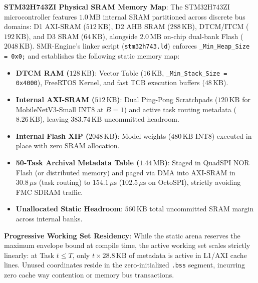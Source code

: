 \documentclass{article}
\begin{document}
\noindent\textbf{STM32H743ZI Physical SRAM Memory Map}:
The STM32H743ZI microcontroller features $1.0\,\text{MB}$ internal SRAM partitioned across discrete bus domains: D1 AXI-SRAM ($512\,\text{KB}$), D2 AHB SRAM ($288\,\text{KB}$), DTCM/ITCM ($192\,\text{KB}$), and D3 SRAM ($64\,\text{KB}$), alongside $2.0\,\text{MB}$ on-chip dual-bank Flash ($2048\,\text{KB}$). SMR-Engine's linker script (\texttt{stm32h743.ld}) enforces \texttt{\_Min\_Heap\_Size = 0x0;} and establishes the following static memory map:
\begin{itemize}\small\setlength{\itemsep}{0pt}\setlength{\parskip}{0pt}
    \item \textbf{DTCM RAM ($128\,\text{KB}$)}: Vector Table ($16\,\text{KB}$, \texttt{\_Min\_Stack\_Size = 0x4000}), FreeRTOS Kernel, and fast TCB execution buffers ($48\,\text{KB}$).
    \item \textbf{Internal AXI-SRAM ($512\,\text{KB}$)}: Dual Ping-Pong Scratchpads ($120\,\text{KB}$ for MobileNetV3-Small INT8 at $B=1$) and active task routing metadata ($8.26\,\text{KB}$), leaving $383.74\,\text{KB}$ uncommitted headroom.
    \item \textbf{Internal Flash XIP ($2048\,\text{KB}$)}: Model weights ($480\,\text{KB}$ INT8) executed in-place with zero SRAM allocation.
    \item \textbf{50-Task Archival Metadata Table ($1.44\,\text{MB}$)}: Staged in QuadSPI NOR Flash (or distributed memory) and paged via DMA into AXI-SRAM in $30.8\,\mu\text{s}$ (task routing) to $154.1\,\mu\text{s}$ ($102.5\,\mu\text{s}$ on OctoSPI), strictly avoiding FMC SDRAM traffic.
    \item \textbf{Unallocated Static Headroom}: $560\,\text{KB}$ total uncommitted SRAM margin across internal banks.
\end{itemize}

\noindent\textbf{Progressive Working Set Residency}: While the static arena reserves the maximum envelope bound at compile time, the active working set scales strictly linearly: at Task $t \le T$, only $t \times 28.8\,\text{KB}$ of metadata is active in L1/AXI cache lines. Unused coordinates reside in the zero-initialized \texttt{.bss} segment, incurring zero cache way contention or memory bus transactions.
\end{document}
